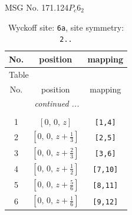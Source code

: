 \documentclass[fleqn,8pt]{jsarticle}
\begin{document}
\setcounter{MaxMatrixCols}{32}

\renewcommand{\tablename}{Table~}
\renewcommand{\figurename}{Figure~}
\begin{center}
\LARGE
MSG No. 171.124\quad$P_{c}6_{2}$
\end{center}
\renewcommand{\arraystretch}{1.2}
\begin{longtable}{ccc}
\caption{Wyckoff site: {\tt 6a}, site symmetry: {\tt 2..}}
 \\
 \hline \hline
No. & position & mapping \\ \hline \endfirsthead

\multicolumn{2}{l}{\tablename\ \thetable{}} \\
 \hline \hline
No. & position & mapping \\ \hline \endhead

 \hline \hline
\multicolumn{2}{r}{\footnotesize\it continued ...} \\ \endfoot

 \hline \hline
\multicolumn{2}{r}{} \\ \endlastfoot

1 & $\left[ 0,\, 0,\, z \right]$ & {\tt [1,4]} \\ \hline
2 & $\left[ 0,\, 0,\, z + \frac{1}{3} \right]$ & {\tt [2,5]} \\ \hline
3 & $\left[ 0,\, 0,\, z + \frac{2}{3} \right]$ & {\tt [3,6]} \\ \hline
4 & $\left[ 0,\, 0,\, z + \frac{1}{2} \right]$ & {\tt [7,10]} \\ \hline
5 & $\left[ 0,\, 0,\, z + \frac{5}{6} \right]$ & {\tt [8,11]} \\ \hline
6 & $\left[ 0,\, 0,\, z + \frac{1}{6} \right]$ & {\tt [9,12]} \\
\end{longtable}
\renewcommand{\arraystretch}{1.2}
\end{document}
